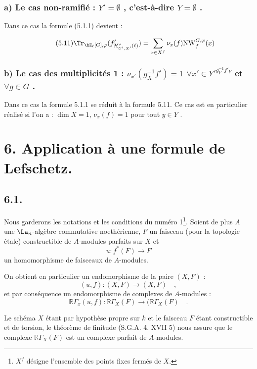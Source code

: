 \subsubsection*{a) Le cas non-ramifié : $Y' = \emptyset$ , c'est-à-dire $Y = \emptyset$ .}

Dans ce cas la formule (5.1.1) devient :

\begin{equation}\tag{5.11}
\Tr_{\bZ_\ell[G],\varphi}(f'_{\mathcal{H}^\vee_{U',X'}(\ell)}) = \sum_{x \in X^f} \nu_x(f) \mathrm{NW}_f^{G,\varphi}(x)
\end{equation}

\subsubsection*{b) Le cas des multiplicités 1 : $\nu_{x'}(g_{X}^{-1}f') = 1$ $\forall x'\in {Y'}^{g_{Y}^{-1}f'_{Y}}$ et $\forall g\in G$ .}

Dans ce cas la formule 5.1.1 se réduit à la formule 5.11. Ce cas est en particulier réalisé si l'on a : $\dim X = 1$, $\nu_x(f)=1$ pour tout $y\in Y$ .
\section*{6. Application à une formule de Lefschetz.}

\subsection*{6.1.}
Nous garderons les notations et les conditions du numéro 1\footnote{$X^f$ désigne l'ensemble des points fixes fermés de $X$.}. Soient de plus $A$ une $\La_n$-algèbre commutative noethérienne, $F$ un faisceau (pour la topologie étale) constructible de $A$-modules parfaits sur $X$ et
\[
u : f^*(F) \longrightarrow F
\]
un homomorphisme de faisceaux de $A$-modules.

On obtient en particulier un endomorphisme de la paire $(X, F)$ :
\[
(u, f) : (X, F) \longrightarrow (X, F) \quad ,
\]
et par conséquence un endomorphisme de complexes de $A$-modules :
\[
\mathbb{R}\Gamma_x(u, f) : \mathbb{R}\Gamma_X(F) \longrightarrow (\mathbb{R}\Gamma_X(F) \quad .
\]

Le schéma $X$ étant par hypothèse propre sur $k$ et le faisceau $F$ étant constructible et de torsion, le théorème de finitude (S.G.A. 4. XVII 5) nous assure que le complexe $\mathbb{R}\Gamma_X(F)$ est un complexe parfait de $A$-modules.

